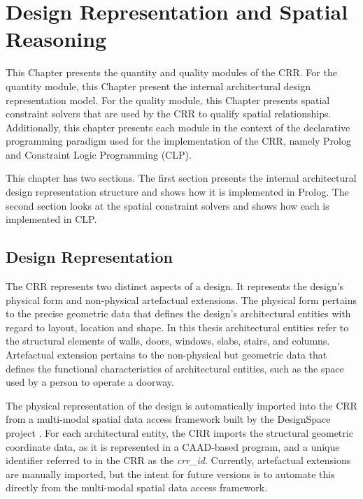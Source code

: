 \documentclass[12pt]{ucthesis}
\begin{document}


\chapter{Design Representation and Spatial Reasoning} \label{representation and reasoning}
This Chapter presents the quantity and quality modules of the CRR. For the quantity module, this Chapter present the internal architectural design representation model. For the quality module, this Chapter presents spatial constraint solvers that are used by the CRR to qualify spatial relationships. Additionally, this chapter presents each module in the context of the declarative programming paradigm used for the implementation of the CRR, namely Prolog and Constraint Logic Programming (CLP). 

This chapter has two sections. The first section presents the internal architectural design representation structure and shows how it is implemented in Prolog. The second section looks at the spatial constraint solvers and shows how each is implemented in CLP.

\section{Design Representation}
The CRR represents two distinct aspects of a design. It represents the design's physical form and non-physical artefactual extensions. The physical form pertains to the precise geometric data that defines the design's architectural entities with regard to layout, location and shape. In this thesis architectural entities refer to the structural elements of walls, doors, windows, slabs, stairs, and columns. Artefactual extension pertains to the non-physical but geometric data that defines the functional characteristics of architectural entities, such as the space used by a person to operate a doorway.

The physical representation of the design is automatically imported into the CRR from a multi-modal spatial data access framework \cite{} built by the DesignSpace project \cite{DesignSpace}. For each architectural entity, the CRR imports the structural geometric coordinate data, as it is represented in a CAAD-based program, and a unique identifier referred to in the CRR as the \emph{crr\_id}. Currently, artefactual extensions are manually imported, but the intent for future versions is to automate this directly from the multi-modal spatial data access framework.  
\end{document}
